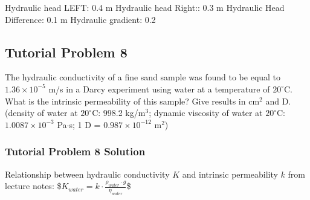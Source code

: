 \documentclass[letterpaper,10pt,english]{sphinxmanual}
\begin{document}
\begin{sphinxVerbatim}[commandchars=\\\{\}]
Hydraulic head LEFT: 0.4 m
Hydraulic head Right:: 0.3 m
Hydraulic Head Difference: \PYGZhy{}0.1 m
Hydraulic gradient: \PYGZhy{}0.2
\end{sphinxVerbatim}


\subsection{Tutorial Problem 8}
\label{\detokenize{contents/tutorials/tutorial_03/tutorial_03:tutorial-problem-8}}
The hydraulic conductivity of a fine sand sample was found to be equal to \(1.36\times 10^{-5}\) m/s in a Darcy experiment using water at a temperature of \(20^\circ\)C. What is the intrinsic permeability of this sample? Give results in cm\(^2\) and D.
(density of water at \(20^\circ\)C: 998.2 kg/m\(^3\); dynamic viscosity of water at \(20^\circ\)C: \(1.0087 \times 10^{-3}\) Pa\(\cdot\)s;  1 D = \(0.987\times 10^{-12}\) m\(^2\))


\subsubsection{Tutorial Problem 8  \sphinxhyphen{} Solution}
\label{\detokenize{contents/tutorials/tutorial_03/tutorial_03:tutorial-problem-8-solution}}

Relationship between hydraulic conductivity \(K\) and intrinsic permeability \(k\) from lecture notes:
\$\(
K_{water} = k\cdot \frac{\rho_{water}\cdot g}{\eta_{water}}
\)\$
\end{document}
